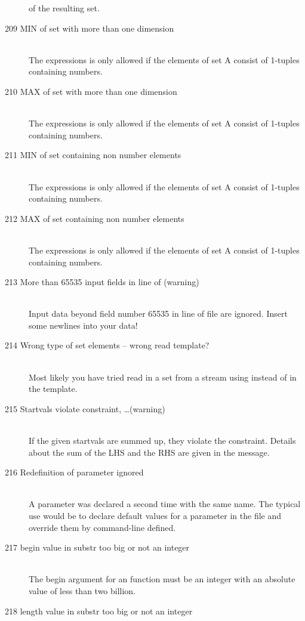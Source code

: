 \begin{description}
   of the resulting set.
\item[209 MIN of set with more than one dimension]\ \\
   The expressions  is only allowed if the elements of 
   set A consist of 1-tuples containing numbers.  
\item[210 MAX of set with more than one dimension]\ \\
   The expressions  is only allowed if the elements of 
   set A consist of 1-tuples containing numbers.  
\item[211 MIN of set containing non number elements]\ \\
   The expressions  is only allowed if the elements of 
   set A consist of 1-tuples containing numbers.  
\item[212 MAX of set containing non number elements]\ \\
   The expressions  is only allowed if the elements of 
   set A consist of 1-tuples containing numbers.  
\item[213 More than 65535 input fields in line \code{xxx} of
   \code{yyy} (warning)]\ \\
   Input data beyond field number 65535 in line  of file
    are ignored. Insert some newlines into your data!
\item[214 Wrong type of set elements -- wrong read template?]\ \\
   Most likely you have tried read in a set from a stream using
    instead of  in the template. 
\item[215 Startvals violate constraint, \ldots (warning)]\ \\
   If the given startvals are summed up, they violate the
   constraint. Details about the sum of the LHS and the RHS are given
   in the message.
\item[216 Redefinition of parameter \code{xxx} ignored]\ \\
   A parameter was declared a second time with the same name. The
   typical use would be to declare default values for a parameter in
   the \zimpl file and override them by command-line defined.
\item[217 begin value \code{xxx} in substr too big or not an integer]\ \\
   The begin argument for an  function
   must be an integer with an absolute value of less than two billion.
\item[218 length value \code{xxx} in substr too big or not an integer]\ \\

\end{description}
